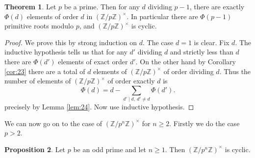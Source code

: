 \documentclass{article}
\newcommand{\Z}{\mathbb{Z}}
\newcommand{\rb}[1]{\left( #1 \right)}
\newcommand{\unit}[1]{\rb{\Z / #1\Z}^\times}
\theoremstyle{definition}\newtheorem{definition}{Definition}
\theoremstyle{definition}\newtheorem*{remark}{Remark}
\theoremstyle{definition}\newtheorem*{example}{Example}
\theoremstyle{definition}\newtheorem*{note}{Note}
\newtheorem{proposition}[definition]{Proposition}
\newtheorem{theorem}[definition]{Theorem}
\begin{document}
\begin{theorem}
\label{thm:26}
Let $ p $ be a prime. Then for any $ d $ dividing $ p - 1 $, there are exactly $ \Phi\rb{d} $ elements of order $ d $ in $ \unit{p} $. In particular there are $ \Phi\rb{p - 1} $ primitive roots modulo $ p $, and $ \unit{p} $ is cyclic.
\end{theorem}

\begin{proof}
We prove this by strong induction on $ d $. The case $ d = 1 $ is clear. Fix $ d $. The inductive hypothesis tells us that for any $ d' $ dividing $ d $ and strictly less than $ d $ there are $ \Phi\rb{d'} $ elements of exact order $ d' $. On the other hand by Corollary \ref{cor:23} there are a total of $ d $ elements of $ \unit{p} $ of order dividing $ d $. Thus the number of elements of $ \unit{p} $ of order exactly $ d $ is
$$ \Phi\rb{d} = d - \sum_{d' \mid d, \ d' \ne d} \Phi\rb{d'}. $$
precisely by Lemma \ref{lem:24}. Now use inductive hypothesis.
\end{proof}


We can now go on to the case of $ \unit{p^n} $ for $ n \ge 2 $. Firstly we do the case $ p > 2 $.

\begin{proposition}
\label{prop:26}
Let $ p $ be an odd prime and let $ n \ge 1 $. Then $ \unit{p^n} $ is cyclic.
\end{proposition}
\end{document}
